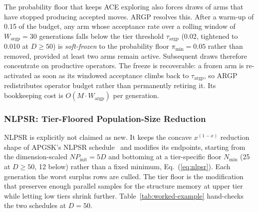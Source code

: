 The probability floor that keeps ACE exploring also forces draws of
arms that have stopped producing accepted moves.
ARGP resolves this. After a warm-up of 0.15 of
the budget, any arm whose acceptance rate over a rolling window of
$W_{\text{argp}}=30$ generations falls below the tier threshold
$\tau_{\text{argp}}$ (0.02, tightened to 0.010 at $D\ge50$) is
\emph{soft-frozen} to the probability floor $\pi_{\min}=0.05$ rather than removed,
provided at least two arms remain active. Subsequent draws therefore
concentrate on productive operators.  The freeze is recoverable: a frozen arm is re-activated
as soon as its windowed acceptance climbs back to $\tau_{\text{argp}}$, so ARGP
redistributes operator budget rather than permanently retiring it. %
Its bookkeeping cost is $O(M\cdot W_{\text{argp}})$ per
generation. %

\subsubsection{NLPSR: Tier-Floored Population-Size Reduction}\label{sec:alg:nlpsr}

NLPSR is explicitly not claimed as new. It keeps the concave $x^{(1-x)}$
reduction shape of APGSK's NLPSR schedule~\cite{apgsk2021} and
modifies its endpoints, starting from the dimension-scaled
$NP_{\text{init}}=5D$ and bottoming at a tier-specific floor
$N_{\min}$ (25 at $D\ge50$, 12 below) rather than a fixed minimum,
Eq.~(\ref{eq:nlpsr}). Each generation the worst surplus rows are
culled. %
The tier floor is the modification that preserves enough parallel
samples for the structure memory at upper tier while letting low
tiers shrink further.
Table~\ref{tab:worked-example} hand-checks the two schedules at
$D=50$.

